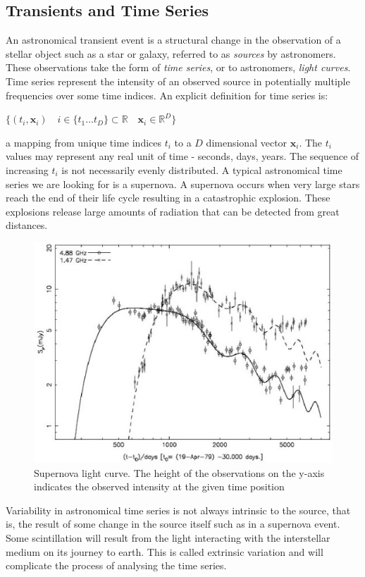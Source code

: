 	\subsection{Transients and Time Series}
	An astronomical transient event is a structural change in the observation of a stellar object such as a star or galaxy, referred to as \emph{sources} by astronomers. These observations take the form of \emph{time series}, or to astronomers, \emph{light curves}. Time series represent the intensity of an observed source in potentially multiple frequencies over some time indices. An explicit definition for time series is:
	\begin{center}
	\begin{math}
		\{(t_i, \mathbf{x}_{i}) \quad i \in \{t_{1} \ldots t_{D}\} \subset \mathbb{R} \quad \mathbf{x}_{i} \in \mathbb{R}^{D} \}
	\end{math}
	\end{center}
	a mapping from unique time indices $t_{i}$ to a $D$ dimensional vector $\mathbf{x}_{i}$. The $t_{i}$ values may represent any real unit of time - seconds, days, years. The sequence of increasing $t_{i}$ is not necessarily evenly distributed. A typical astronomical time series we are looking for is a supernova. A supernova occurs when very large stars reach the end of their life cycle resulting in a catastrophic explosion. These explosions release large amounts of radiation that can be detected from great distances.
	\begin{figure}[ht!]
	\centering
	\includegraphics[width=120mm]{images/supernova.eps}
	\caption{Supernova light curve. The height of the observations on the y-axis indicates the observed intensity at the given time position}
	\end{figure}
	Variability in astronomical time series is not always intrinsic to the source, that is, the result of some change in the source itself such as in a supernova event. Some scintillation will result from the light interacting with the interstellar medium on its journey to earth. This is called extrinsic variation and will complicate the process of analysing the time series.
